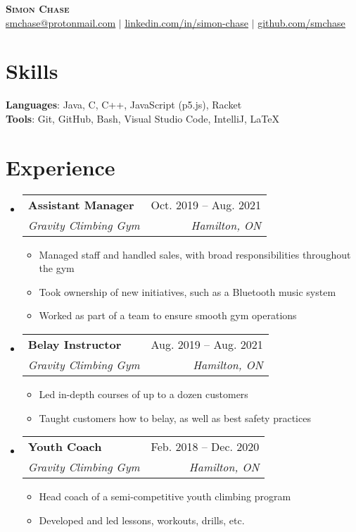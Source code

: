 \documentclass[letterpaper,11pt]{article}
\makeatletter
\newcommand{\resumeItem}[1]{
	\item\small{
		{#1 \vspace{-2pt}}
	}
}
\newcommand{\resumeSubheading}[4]{
	\vspace{-2pt}\item
		\begin{tabular*}{0.97\textwidth}[t]{l@{\extracolsep{\fill}}r}
			\textbf{#1} & #2 \\
			\textit{\small#3} & \textit{\small #4} \\
		\end{tabular*}\vspace{-7pt}
}
\newcommand{\resumeSubHeadingListStart}{\begin{itemize}[leftmargin=0.15in, label={}]}
\newcommand{\resumeSubHeadingListEnd}{\end{itemize}}
\newcommand{\resumeItemListStart}{\begin{itemize}}
\newcommand{\resumeItemListEnd}{\end{itemize}\vspace{-5pt}}
\makeatother
\begin{document}
\begin{center}
    \textbf{\Huge \scshape Simon Chase} \\ \vspace{1pt}
    \small
	\href{mailto:smchase@protonmail.com}{\underline{smchase@protonmail.com}} $|$ 
    \href{https://linkedin.com/in/simon-chase}{\underline{linkedin.com/in/simon-chase}} $|$
    \href{https://github.com/smchase}{\underline{github.com/smchase}}
\end{center}


\section{Skills}
\begin{itemize}[leftmargin=0.15in, label={}]
\small{\item{
	\textbf{Languages}{: Java, C, C++, JavaScript (p5.js), Racket} \\
	\textbf{Tools}{: Git, GitHub, Bash, Visual Studio Code, IntelliJ, \LaTeX}
}}
\end{itemize}


\section{Experience}
\resumeSubHeadingListStart
	\resumeSubheading
		{Assistant Manager}{Oct. 2019 -- Aug. 2021}
		{Gravity Climbing Gym}{Hamilton, ON}
		\resumeItemListStart
			\resumeItem{Managed staff and handled sales, with broad responsibilities throughout the gym}
			\resumeItem{Took ownership of new initiatives, such as a Bluetooth music system}
			\resumeItem{Worked as part of a team to ensure smooth gym operations}
		\resumeItemListEnd

	\resumeSubheading
		{Belay Instructor}{Aug. 2019 -- Aug. 2021}
		{Gravity Climbing Gym}{Hamilton, ON}
		\resumeItemListStart
			\resumeItem{Led in-depth courses of up to a dozen customers}
			\resumeItem{Taught customers how to belay, as well as best safety practices}
		\resumeItemListEnd

	\resumeSubheading
		{Youth Coach}{Feb. 2018 -- Dec. 2020}
		{Gravity Climbing Gym}{Hamilton, ON}
		\resumeItemListStart
			\resumeItem{Head coach of a semi-competitive youth climbing program}
			\resumeItem{Developed and led lessons, workouts, drills, etc.}
		\resumeItemListEnd
\resumeSubHeadingListEnd


\end{document}
